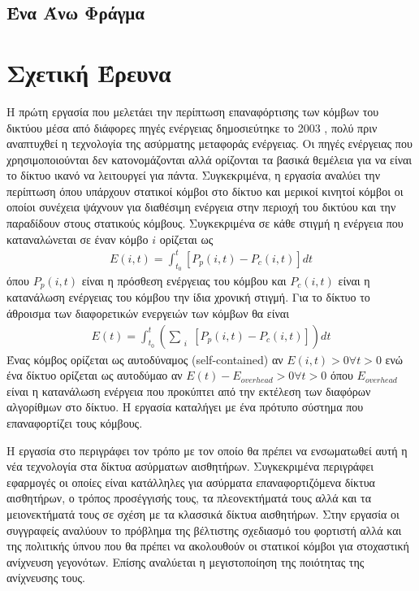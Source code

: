 \subsection{Ένα Άνω Φράγμα}

\section{Σχετική Έρευνα}
Η πρώτη εργασία που μελετάει την περίπτωση επαναφόρτισης των κόμβων του δικτύου μέσα από διάφορες πηγές ενέργειας δημοσιεύτηκε το 2003 \cite{estrin_recharge}, πολύ
πριν αναπτυχθεί η τεχνολογία της ασύρματης μεταφοράς ενέργειας. Οι πηγές ενέργειας που χρησιμοποιούνται δεν κατονομάζονται αλλά ορίζονται τα βασικά θεμέλεια για να
είναι το δίκτυο ικανό να λειτουργεί για πάντα. Συγκεκριμένα, η εργασία αναλύει την περίπτωση όπου υπάρχουν στατικοί κόμβοι στο δίκτυο και μερικοί κινητοί κόμβοι οι
οποίοι συνέχεια ψάχνουν για διαθέσιμη ενέργεια στην περιοχή του δικτύου και την παραδίδουν στους στατικούς κόμβους.
Συγκεκριμένα σε κάθε στιγμή η ενέργεια που καταναλώνεται σε έναν κόμβο $i$ ορίζεται ως
\begin{align*}
E(i,t)=\int^{t}_{t_{0}}[P_{p}(i,t)-P_{c}(i,t)]dt
\end{align*}
όπου $P_{p}(i,t)$ είναι η πρόσθεση ενέργειας του κόμβου και $P_{c}(i,t)$ είναι η κατανάλωση ενέργειας του κόμβου την ίδια χρονική στιγμή. Για το δίκτυο το άθροισμα
των διαφορετικών ενεργειών των κόμβων θα είναι
\begin{align*}
E(t)=\int^{t}_{t_{0}}(\sum\limits_{\substack{i}}[P_{p}(i,t)-P_{c}(i,t)])dt
\end{align*}
Ένας κόμβος ορίζεται ως αυτοδύναμος (self-contained) αν $E(i,t)>0 \forall t>0$ ενώ ένα δίκτυο ορίζεται ως αυτοδύμαο αν $E(t)-E_{overhead}>0\forall t>0$ όπου 
$E_{overhead}$ είναι η κατανάλωση ενέργεια που προκύπτει από την εκτέλεση των διαφόρων αλγορίθμων στο δίκτυο. Η εργασία καταλήγει με ένα πρότυπο σύστημα που
επαναφορτίζει τους κόμβους.

Η εργασία στο \cite{smart_dust_revisited} περιγράφει τον τρόπο με τον οποίο θα πρέπει να ενσωματωθεί αυτή η νέα τεχνολογία στα δίκτυα ασύρματων αισθητήρων.
Συγκεκριμένα περιγράφει εφαρμογές οι οποίες είναι κατάλληλες για ασύρματα επαναφορτιζόμενα δίκτυα αισθητήρων, ο τρόπος προσέγγισής τους, τα πλεονεκτήματά τους αλλά
και τα μειονεκτήματά τους σε σχέση με τα κλασσικά δίκτυα αισθητήρων. Στην εργασία \cite{optimal_scheduling} οι συγγραφείς αναλύουν το πρόβλημα της βέλτιστης
σχεδιασμό του φορτιστή αλλά και της πολιτικής ύπνου που θα πρέπει να ακολουθούν οι στατικοί κόμβοι για στοχαστική ανίχνευση γεγονότων. Επίσης αναλύεται η
μεγιστοποίηση της ποιότητας της ανίχνευσης τους.

